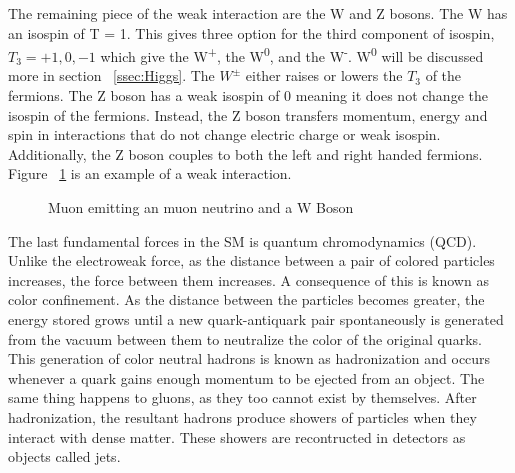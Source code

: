 \indent The remaining piece of the weak interaction are the W and Z bosons. The W has an isospin of T = 1. This gives three option for the third component of isospin, ${T_{3} = +1, 0, -1}$ which give the W\textsuperscript{+}, the W\textsuperscript{0}, and the W\textsuperscript{-}. W\textsuperscript{0} will be discussed more in section ~\ref{ssec:Higgs}. The ${W^{\pm}}$ either raises or lowers the ${T_{3}}$ of the fermions. The Z boson has a weak isospin of 0 meaning it does not change the isospin of the fermions. Instead, the Z boson transfers momentum, energy and spin in interactions that do not change electric charge or weak isospin. Additionally, the Z boson couples to both the left and right handed fermions. Figure ~\ref{Fig:weak_dia} is an example of a weak interaction.\newline

\begin{figure}[h]
\begin{center}

\caption[Muon emitting a neutrino]{Muon emitting an muon neutrino and a W Boson}
\label{Fig:weak_dia}
\end{center}
\end{figure}


The last fundamental forces in the SM is quantum chromodynamics (QCD). %
 Unlike the electroweak force, as the distance between a pair of colored particles increases, the force between them increases. A consequence of this is known as color confinement. As the distance between the particles becomes greater, the energy stored grows until a new quark-antiquark pair spontaneously is generated from the vacuum between them to neutralize the color of the original quarks. This generation of color neutral hadrons is known as hadronization and occurs whenever a quark gains enough momentum to be ejected from an object. The same thing happens to gluons, as they too cannot exist by themselves. After hadronization, the resultant hadrons produce showers of particles when they interact with dense matter. These showers are recontructed in detectors as objects called jets. 
